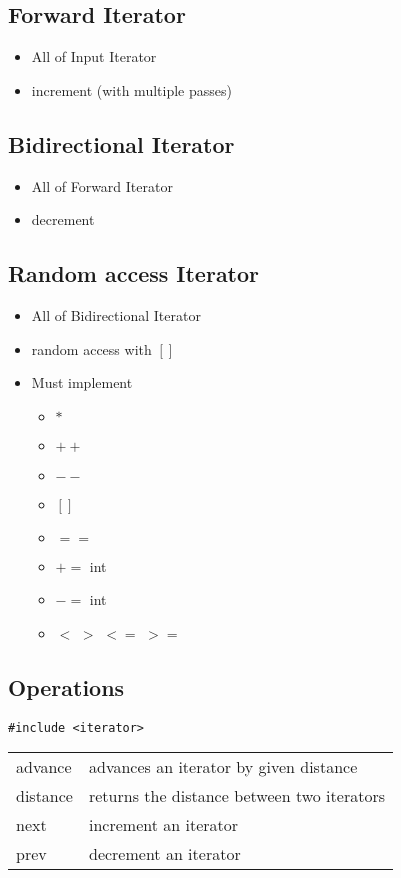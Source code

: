 \subsection{Forward Iterator}
\begin{itemize}
	\item All of Input Iterator
	\item increment (with multiple passes)
\end{itemize}

\subsection{Bidirectional Iterator}
\begin{itemize}
	\item All of Forward Iterator
	\item decrement
\end{itemize}

\subsection{Random access Iterator}
\begin{itemize}
	\item All of Bidirectional Iterator
	\item random access with $[]$
	\item Must implement
	\begin{itemize}
		\item $*$
		\item $++$
		\item $--$
		\item $[]$
		\item $==$
		\item $+=$ int
		\item $-=$ int
		\item $<$ $>$ $<=$ $>=$
	\end{itemize}
\end{itemize}

\subsection{Operations}
\begin{lstlisting}
#include <iterator>
\end{lstlisting}
\begin{tabularx}{\columnwidth}{lX}
	advance  & advances an iterator by given distance \\
	distance & returns the distance between two iterators \\
	next     & increment an iterator \\
	prev     & decrement an iterator \\
\end{tabularx}


